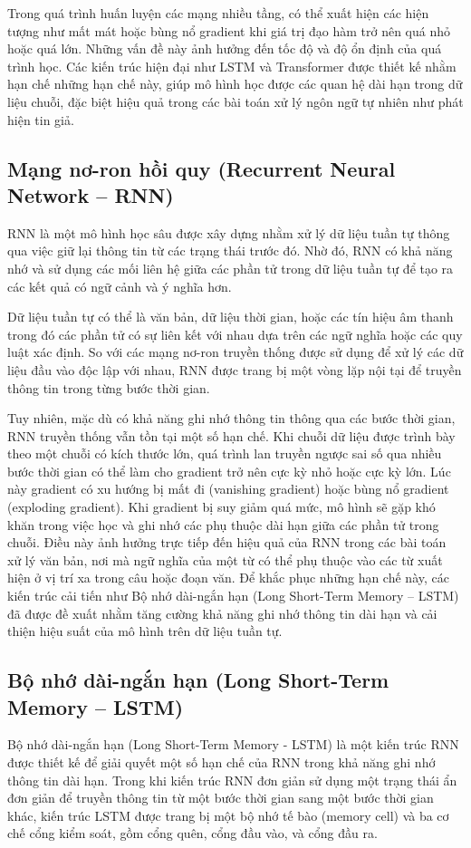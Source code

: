 \documentclass[12pt, a4paper]{report}
\begin{document}
Trong quá trình huấn luyện các mạng nhiều tầng, có thể xuất hiện các hiện tượng như mất mát hoặc bùng nổ gradient khi giá trị đạo hàm trở nên quá nhỏ hoặc quá lớn. Những vấn đề này ảnh hưởng đến tốc độ và độ ổn định của quá trình học. Các kiến trúc hiện đại như LSTM và Transformer được thiết kế nhằm hạn chế những hạn chế này, giúp mô hình học được các quan hệ dài hạn trong dữ liệu chuỗi, đặc biệt hiệu quả trong các bài toán xử lý ngôn ngữ tự nhiên như phát hiện tin giả.

\subsection{Mạng nơ-ron hồi quy (Recurrent Neural Network -- RNN)}

RNN là một mô hình học sâu được xây dựng nhằm xử lý dữ liệu tuần tự thông qua việc giữ lại thông tin từ các trạng thái trước đó. Nhờ đó, RNN có khả năng nhớ và sử dụng các mối liên hệ giữa các phần tử trong dữ liệu tuần tự để tạo ra các kết quả có ngữ cảnh và ý nghĩa hơn. 

Dữ liệu tuần tự có thể là văn bản, dữ liệu thời gian, hoặc các tín hiệu âm thanh trong đó các phần tử có sự liên kết với nhau dựa trên các ngữ nghĩa hoặc các quy luật xác định. So với các mạng nơ-ron truyền thống được sử dụng để xử lý các dữ liệu đầu vào độc lập với nhau, RNN được trang bị một vòng lặp nội tại để truyền thông tin trong từng bước thời gian.

Tuy nhiên, mặc dù có khả năng ghi nhớ thông tin thông qua các bước thời gian, RNN truyền thống vẫn tồn tại một số hạn chế. Khi chuỗi dữ liệu được trình bày theo một chuỗi có kích thước lớn, quá trình lan truyền ngược sai số qua nhiều bước thời gian có thể làm cho gradient trở nên cực kỳ nhỏ hoặc cực kỳ lớn. Lúc này gradient có xu hướng bị mất đi (vanishing gradient) hoặc bùng nổ gradient (exploding gradient). Khi gradient bị suy giảm quá mức, mô hình sẽ gặp khó khăn trong việc học và ghi nhớ các phụ thuộc dài hạn giữa các phần tử trong chuỗi. Điều này ảnh hưởng trực tiếp đến hiệu quả của RNN trong các bài toán xử lý văn bản, nơi mà ngữ nghĩa của một từ có thể phụ thuộc vào các từ xuất hiện ở vị trí xa trong câu hoặc đoạn văn. Để khắc phục những hạn chế này, các kiến trúc cải tiến như Bộ nhớ dài-ngắn hạn (Long Short-Term Memory -- LSTM) đã được đề xuất nhằm tăng cường khả năng ghi nhớ thông tin dài hạn và cải thiện hiệu suất của mô hình trên dữ liệu tuần tự.

\subsection{Bộ nhớ dài-ngắn hạn (Long Short-Term Memory -- LSTM)}
Bộ nhớ dài-ngắn hạn (Long Short-Term Memory - LSTM) là một kiến trúc RNN được thiết kế để giải quyết một số hạn chế của RNN trong khả năng ghi nhớ thông tin dài hạn. Trong khi kiến trúc RNN đơn giản sử dụng một trạng thái ẩn đơn giản để truyền thông tin từ một bước thời gian sang một bước thời gian khác, kiến trúc LSTM được trang bị một bộ nhớ tế bào (memory cell) và ba cơ chế cổng kiểm soát, gồm cổng quên, cổng đầu vào, và cổng đầu ra.
\end{document}
